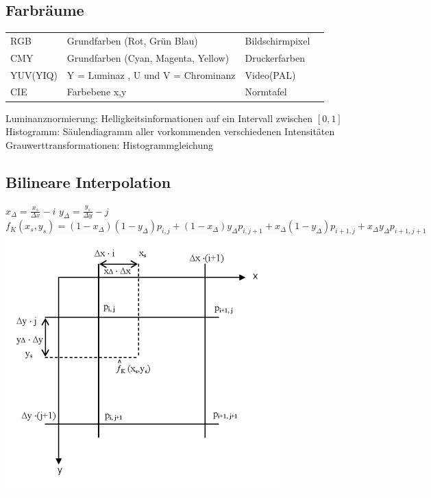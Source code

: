 \documentclass[fs, footer]{latex4ei}
\begin{document}
\begin{multicols*}{4}
	\subsection{Farbräume}
	\begin{tabular}{llll}
	RGB & Grundfarben (Rot, Grün Blau) & Bildschirmpixel\\
	CMY & Grundfarben (Cyan, Magenta, Yellow) & Druckerfarben\\
	YUV(YIQ) & Y = Luminaz , U und V = Chrominanz & Video(PAL)\\
	CIE & Farbebene x,y & Normtafel\\
	\end{tabular}
	
	Luminanznormierung: Helligkeitsinformationen auf ein Intervall zwischen $[0,1]$\\
	Histogramm: Säulendiagramm aller vorkommenden verschiedenen Intensitäten\\
	Grauwerttransformationen: Histogrammgleichung\\


	\subsection{Bilineare Interpolation}
	$x_{\Delta} = \frac{x_s}{\Delta x} - i$ \qquad $y_{\Delta} = \frac{y_s}{\Delta y} - j$\\
	$f_K(x_s, y_s) = (1-x_{\Delta})(1-y_{\Delta}) p_{i,j} + (1-x_{\Delta}) y_{\Delta} p_{i,j+1} + x_{\Delta} (1-y_{\Delta}) p_{i+1,j} + x_{\Delta} y_{\Delta} p_{i+1,j+1}$\\
	\includegraphics{./img/billinear.png}
	

\end{multicols*}
\end{document}
